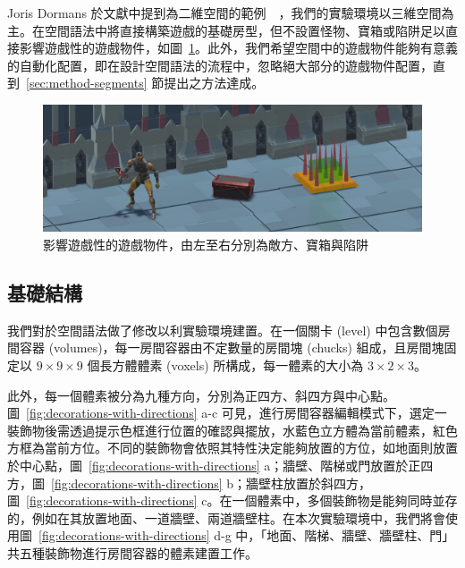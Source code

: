 Joris Dormans 於文獻中提到為二維空間的範例~\cite{dormans2010adventures}~\cite{dormans2012engineering}，我們的實驗環境以三維空間為主。在空間語法中將直接構築遊戲的基礎房型，但不設置怪物、寶箱或陷阱足以直接影響遊戲性的遊戲物件，如圖~\ref{fig:gameobject-list}。此外，我們希望空間中的遊戲物件能夠有意義的自動化配置，即在設計空間語法的流程中，忽略絕大部分的遊戲物件配置，直到~\ref{sec:method-segments} 節提出之方法達成。

\begin{figure}[!htb]
  \begin{center}
    \includegraphics[width=1.0\textwidth]{figures/gameobject-list.png}
    \caption{影響遊戲性的遊戲物件，由左至右分別為敵方、寶箱與陷阱} 
    \label{fig:gameobject-list}
  \end{center}
\end{figure}

\subsection{基礎結構}
\label{ssec:method-spacepieces-basic}

我們對於空間語法做了修改以利實驗環境建置。在一個關卡 (level) 中包含數個房間容器 (volumes)，每一房間容器由不定數量的房間塊 (chucks) 組成，且房間塊固定以 $9\times 9\times 9$ 個長方體體素 (voxels) 所構成，每一體素的大小為 $3\times 2\times 3$。

此外，每一個體素被分為九種方向，分別為正四方、斜四方與中心點。圖~\ref{fig:decorations-with-directions} a-c 可見，進行房間容器編輯模式下，選定一裝飾物後需透過提示色框進行位置的確認與擺放，水藍色立方體為當前體素，紅色方框為當前方位。不同的裝飾物會依照其特性決定能夠放置的方位，如地面則放置於中心點，圖~\ref{fig:decorations-with-directions} a；牆壁、階梯或門放置於正四方，圖~\ref{fig:decorations-with-directions} b；牆壁柱放置於斜四方，圖~\ref{fig:decorations-with-directions} c。在一個體素中，多個裝飾物是能夠同時並存的，例如在其放置地面、一道牆壁、兩道牆壁柱。在本次實驗環境中，我們將會使用圖~\ref{fig:decorations-with-directions} d-g 中，「地面、階梯、牆壁、牆壁柱、門」共五種裝飾物進行房間容器的體素建置工作。

